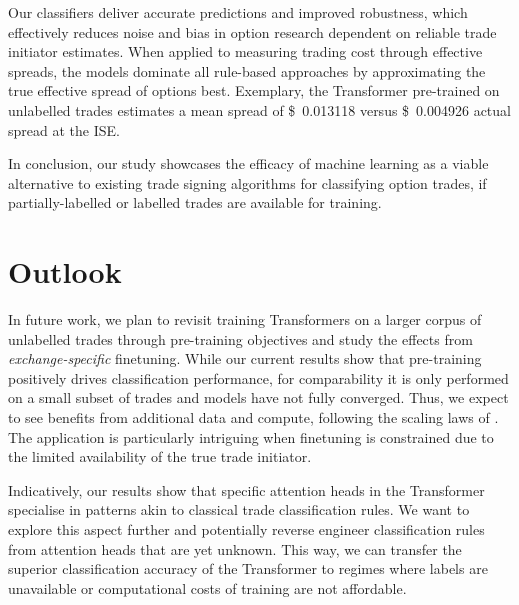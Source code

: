 Our classifiers deliver accurate predictions and improved robustness, which effectively reduces noise and bias in option research dependent on reliable trade initiator estimates. When applied to measuring trading cost through effective spreads, the models dominate all rule-based approaches by approximating the true effective spread of options best. Exemplary, the Transformer pre-trained on unlabelled trades estimates a mean spread of  \SI[round-mode=places, round-precision=3]{0.013118}[\$]{} versus \SI[round-mode=places, round-precision=3]{0.004926}[\$]{} actual spread at the \gls{ISE}.

In conclusion, our study showcases the efficacy of machine learning as a viable alternative to existing trade signing algorithms for classifying option trades, if partially-labelled or labelled trades are available for training. %

\newpage
\section{Outlook}\label{sec:outlook}

In future work, we plan to revisit training Transformers on a larger corpus of unlabelled trades through pre-training objectives and study the effects from \emph{exchange-specific} finetuning. While our current results show that pre-training positively drives classification performance, for comparability it is only performed on a small subset of trades and models have not fully converged. Thus, we expect to see benefits from additional data and compute, following the scaling laws of \textcite[][7]{hoffmannTrainingComputeOptimalLarge2022}. The application is particularly intriguing when finetuning is constrained due to the limited availability of the true trade initiator.

Indicatively, our results show that specific attention heads in the Transformer specialise in patterns akin to classical trade classification rules. We want to explore this aspect further and potentially reverse engineer classification rules from attention heads that are yet unknown. This way, we can transfer the superior classification accuracy of the Transformer to regimes where labels are unavailable or computational costs of training are not affordable.